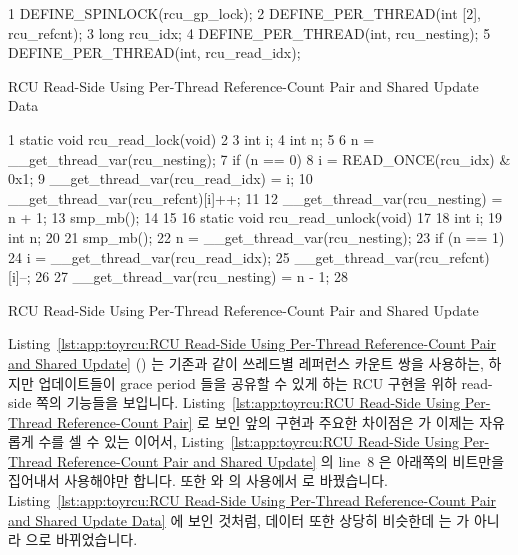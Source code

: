 \begin{listing}[tbp]
{ \scriptsize
\begin{verbbox}
  1 DEFINE_SPINLOCK(rcu_gp_lock);
  2 DEFINE_PER_THREAD(int [2], rcu_refcnt);
  3 long rcu_idx;
  4 DEFINE_PER_THREAD(int, rcu_nesting);
  5 DEFINE_PER_THREAD(int, rcu_read_idx);
\end{verbbox}
}
\centering
\theverbbox
\caption{RCU Read-Side Using Per-Thread Reference-Count Pair and Shared Update Data}
\label{lst:app:toyrcu:RCU Read-Side Using Per-Thread Reference-Count Pair and Shared Update Data}
\end{listing}

\begin{listing}[tbp]
{ \scriptsize
\begin{verbbox}
  1 static void rcu_read_lock(void)
  2 {
  3   int i;
  4   int n;
  5
  6   n = __get_thread_var(rcu_nesting);
  7   if (n == 0) {
  8     i = READ_ONCE(rcu_idx) & 0x1;
  9     __get_thread_var(rcu_read_idx) = i;
 10     __get_thread_var(rcu_refcnt)[i]++;
 11   }
 12   __get_thread_var(rcu_nesting) = n + 1;
 13   smp_mb();
 14 }
 15
 16 static void rcu_read_unlock(void)
 17 {
 18   int i;
 19   int n;
 20
 21   smp_mb();
 22   n = __get_thread_var(rcu_nesting);
 23   if (n == 1) {
 24      i = __get_thread_var(rcu_read_idx);
 25      __get_thread_var(rcu_refcnt)[i]--;
 26   }
 27   __get_thread_var(rcu_nesting) = n - 1;
 28 }
\end{verbbox}
}
\centering
\theverbbox
\caption{RCU Read-Side Using Per-Thread Reference-Count Pair and Shared Update}
\label{lst:app:toyrcu:RCU Read-Side Using Per-Thread Reference-Count Pair and Shared Update}
\end{listing}

Listing~\ref{lst:app:toyrcu:RCU Read-Side Using Per-Thread Reference-Count Pair and Shared Update}
()
는 기존과 같이 쓰레드별 레퍼런스 카운트 쌍을 사용하는, 하지만 업데이트들이
grace period 들을 공유할 수 있게 하는 RCU 구현을 위하 read-side 쪽의 기능들을
보입니다.
Listing~\ref{lst:app:toyrcu:RCU Read-Side Using Per-Thread Reference-Count Pair} 로
보인 앞의 구현과 주요한 차이점은  가 이제는 자유롭게 수를 셀 수
있는  이어서,
Listing~\ref{lst:app:toyrcu:RCU Read-Side Using Per-Thread Reference-Count Pair and Shared Update}
의 line~8 은 아래쪽의 비트만을 집어내서 사용해야만 합니다.
또한  와  의 사용에서  로
바꿨습니다.
Listing~\ref{lst:app:toyrcu:RCU Read-Side Using Per-Thread Reference-Count Pair and Shared Update Data}
에 보인 것처럼, 데이터 또한 상당히 비슷한데  는  가
아니라  으로 바뀌었습니다.
\iffalse

